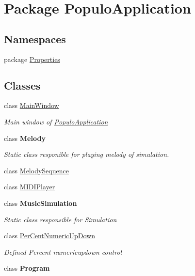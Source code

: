 \hypertarget{namespace_populo_application}{\section{Package Populo\+Application}
\label{namespace_populo_application}
}
\subsection*{Namespaces}
\begin{DoxyCompactItemize}
\item 
package \hyperlink{namespace_populo_application_1_1_properties}{Properties}
\end{DoxyCompactItemize}
\subsection*{Classes}
\begin{DoxyCompactItemize}
\item 
class \hyperlink{class_populo_application_1_1_main_window}{Main\+Window}
\begin{DoxyCompactList}\small\item\em Main window of \hyperlink{namespace_populo_application}{Populo\+Application} \end{DoxyCompactList}\item 
class {\bfseries Melody}
\begin{DoxyCompactList}\small\item\em Static class responible for playing melody of simulation. \end{DoxyCompactList}\item 
class \hyperlink{class_populo_application_1_1_melody_sequence}{Melody\+Sequence}
\item 
class \hyperlink{class_populo_application_1_1_m_i_d_i_player}{M\+I\+D\+I\+Player}
\item 
class {\bfseries Music\+Simulation}
\begin{DoxyCompactList}\small\item\em Static class responsible for Simulation \end{DoxyCompactList}\item 
class \hyperlink{class_populo_application_1_1_per_cent_numeric_up_down}{Per\+Cent\+Numeric\+Up\+Down}
\begin{DoxyCompactList}\small\item\em Defined Percent numericupdown control \end{DoxyCompactList}\item 
class {\bfseries Program}
\end{DoxyCompactItemize}
